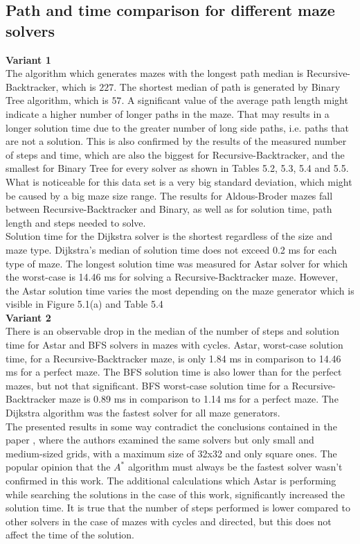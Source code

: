 \subsection{Path and time comparison for different maze solvers}
\textbf{Variant 1}\\
\indent The algorithm which generates mazes with the longest path median is Recursive-Backtracker, which is $227$. The shortest median of path is generated by
Binary Tree algorithm, which is $57$. A significant value of the average path length might indicate a higher number of longer paths in the maze. That 
may results in a longer solution time due to the greater number of long side paths, i.e. paths that are not a solution. This is also confirmed by the results of
the measured number of steps and time, which are also the biggest for Recursive-Backtracker, and the smallest for Binary Tree for every solver as shown in
Tables 5.2, 5.3, 5.4 and 5.5. What is noticeable for this data set is a very big standard deviation, which might be caused by a big maze size range.
The results for Aldous-Broder mazes fall between Recursive-Backtracker and Binary, as well as for solution time, path length and steps needed to solve.\\
\indent Solution time for the Dijkstra solver is the shortest regardless of the size and maze type. Dijkstra's median of solution time does not exceed 0.2 ms for each type of maze.
The longest solution time was measured for Astar solver for which the worst-case is 14.46 ms for solving a Recursive-Backtracker maze.
However, the Astar solution time varies the most depending on the maze generator which is visible in Figure 5.1(a) and Table 5.4\\
\indent \textbf{Variant 2}\\ 
\indent There is an observable drop in the median of the number of steps and solution time for Astar and BFS solvers in mazes with cycles. Astar, worst-case solution time, 
for a Recursive-Backtracker maze, is only 1.84 ms in comparison to 14.46 ms for a perfect maze. The BFS solution time is also lower than for the perfect mazes, but not
that significant. BFS worst-case solution time for a Recursive-Backtracker maze is 0.89 ms in comparison to 1.14 ms for a perfect maze. 
The Dijkstra algorithm was the fastest solver for all maze generators.\\
\indent The presented results in some way contradict the conclusions contained in the paper \cite{31}, where the authors examined the same solvers but 
only small and medium-sized grids, with a maximum size of 32x32 and only square ones. The popular opinion \cite{32} that the $A^*$ algorithm must always be the fastest solver wasn't
confirmed in this work. The additional calculations which Astar is performing while searching the solutions in the case of this work, significantly increased
the solution time. It is true that the number of steps performed is lower compared to other solvers in the case of mazes with cycles and directed,
but this does not affect the time of the solution.\\
